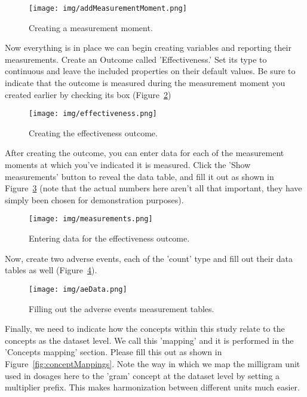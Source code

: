 \documentclass[12pt]{article}
\begin{document}
\begin{figure}[!htbp]
  \centering
  \texttt{[image: img/addMeasurementMoment.png]}
  \caption{Creating a measurement moment.}
\label{fig:addMeasurementMoment}
\end{figure}

Now everything is in place we can begin creating variables and reporting their measurements. Create an Outcome called 'Effectiveness.' Set its type to continuous and leave the included properties on their default values. Be sure to indicate that the outcome is measured during the measurement moment you created earlier by checking its box (Figure~\ref{fig:effectiveness})

\begin{figure}[!htbp]
  \centering
  \texttt{[image: img/effectiveness.png]}
  \caption{Creating the effectiveness outcome.}
\label{fig:effectiveness}
\end{figure}

After creating the outcome, you can enter data for each of the measurement moments at which you've indicated it is measured. Click the 'Show measurements' button to reveal the data table, and fill it out as shown in Figure~\ref{fig:measurements} (note that the actual numbers here aren't all that important, they have simply been chosen for demonstration purposes).

\begin{figure}[!htbp]
  \centering
  \texttt{[image: img/measurements.png]}
  \caption{Entering data for the effectiveness outcome.}
\label{fig:measurements}
\end{figure}

Now, create two adverse events, each of the 'count' type and fill out their data tables as well (Figure~\ref{fig:aeData}).

\begin{figure}[!htbp]
  \centering
  \texttt{[image: img/aeData.png]}
  \caption{Filling out the adverse events measurement tables.}
\label{fig:aeData}
\end{figure}

Finally, we need to indicate how the concepts within this study relate to the concepts as the dataset level. We call this 'mapping' and it is performed in the 'Concepts mapping' section. Please fill this out as shown in Figure~\ref{fig:conceptMappings}. Note the way in which we map the milligram unit used in dosages here to the 'gram' concept at the dataset level by setting a multiplier prefix. This makes harmonization between different units much easier.
\end{document}
